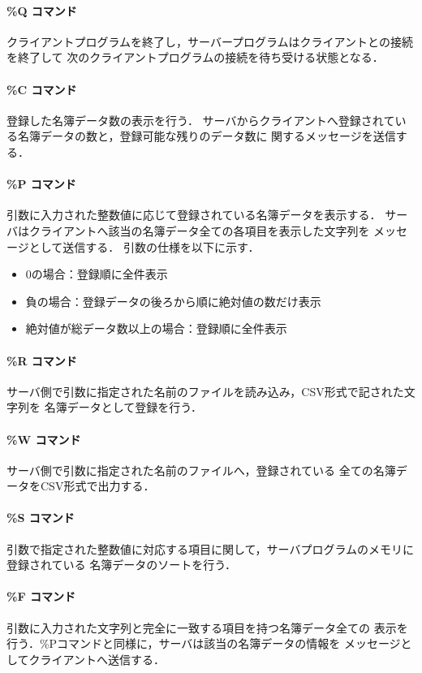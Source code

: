 \paragraph*{\%Q コマンド}
クライアントプログラムを終了し，サーバープログラムはクライアントとの接続を終了して
次のクライアントプログラムの接続を待ち受ける状態となる．

\paragraph*{\%C コマンド}
登録した名簿データ数の表示を行う．
サーバからクライアントへ登録されている名簿データの数と，登録可能な残りのデータ数に
関するメッセージを送信する．

\paragraph*{\%P コマンド}
引数に入力された整数値に応じて登録されている名簿データを表示する．
サーバはクライアントへ該当の名簿データ全ての各項目を表示した文字列を
メッセージとして送信する．
引数の仕様を以下に示す．
\begin{itemize}
  \item $0$の場合：登録順に全件表示
  \item 負の場合：登録データの後ろから順に絶対値の数だけ表示
  \item 絶対値が総データ数以上の場合：登録順に全件表示
\end{itemize}

\paragraph*{\%R コマンド}
サーバ側で引数に指定された名前のファイルを読み込み，CSV形式で記された文字列を
名簿データとして登録を行う．

\paragraph*{\%W コマンド}
サーバ側で引数に指定された名前のファイルへ，登録されている
全ての名簿データをCSV形式で出力する．

\paragraph*{\%S コマンド}
引数で指定された整数値に対応する項目に関して，サーバプログラムのメモリに登録されている
名簿データのソートを行う．

\paragraph*{\%F コマンド}
引数に入力された文字列と完全に一致する項目を持つ名簿データ全ての
表示を行う．\%Pコマンドと同様に，サーバは該当の名簿データの情報を
メッセージとしてクライアントへ送信する．

